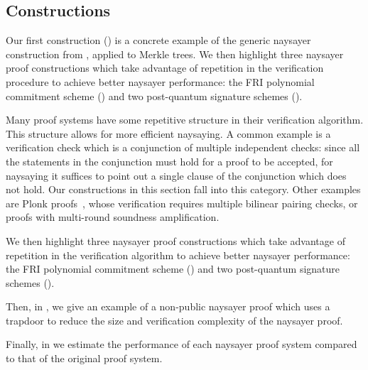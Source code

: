\subsection{Constructions}\label{sec:naysayer_apps}

Our first construction () is a concrete example of the generic naysayer construction from , applied to Merkle trees. 
We then highlight three naysayer proof constructions which take advantage of repetition in the verification procedure to achieve better naysayer performance: the FRI polynomial commitment scheme () and two post-quantum signature schemes (). 

Many proof systems have some repetitive structure in their verification algorithm. This structure allows for more efficient naysaying. A common example is a verification check which is a conjunction of multiple independent checks: since all the statements in the conjunction must hold for a proof to be accepted, for naysaying it suffices to point out a single clause of the conjunction which does not hold. Our constructions in this section fall into this category. Other examples are Plonk proofs~\cite{EPRINT:GabWilCio19}, whose verification requires multiple bilinear pairing checks, or proofs with multi-round soundness amplification.

We then highlight three naysayer proof constructions which take advantage of repetition in the verification algorithm to achieve better naysayer performance: the FRI polynomial commitment scheme () and two post-quantum signature schemes (). 

Then, in , we give an example of a non-public naysayer proof which uses a trapdoor to reduce the size and verification complexity of the naysayer proof. %

Finally, in  we
estimate the performance of each naysayer proof system compared to that of the original proof system.


